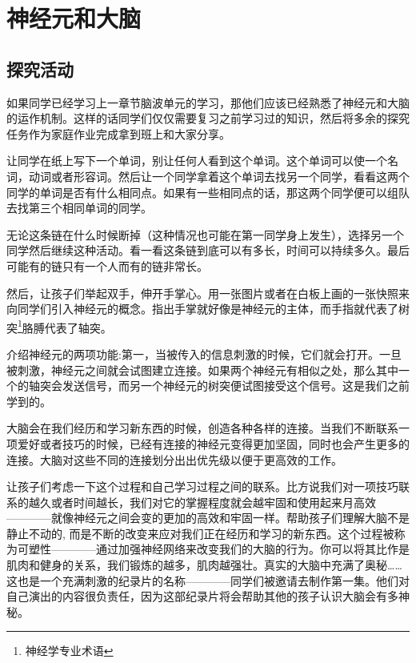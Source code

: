 \chapter{神经元和大脑}
   
\section{探究活动}
      \begin{note}
        如果同学已经学习上一章节脑波单元的学习，那他们应该已经熟悉了神经元和大脑的运作机制。这样的话同学们仅仅需要复习之前学习过的知识，然后将多余的探究任务作为家庭作业完成拿到班上和大家分享。        
      \end{note}  
      让同学在纸上写下一个单词，别让任何人看到这个单词。这个单词可以使一个名词，动词或者形容词。然后让一个同学拿着这个单词去找另一个同学，看看这两个同学的单词是否有什么相同点。如果有一些相同点的话，那这两个同学便可以组队去找第三个相同单词的同学。\par
      无论这条链在什么时候断掉（这种情况也可能在第一同学身上发生），选择另一个同学然后继续这种活动。看一看这条链到底可以有多长，时间可以持续多久。最后可能有的链只有一个人而有的链非常长。\par
      然后，让孩子们举起双手，伸开手掌心。用一张图片或者在白板上画的一张快照来向同学们引入神经元的概念。指出手掌就好像是神经元的主体，而手指就代表了树突\footnote{神经学专业术语}胳膊代表了轴突。\par
      介绍神经元的两项功能:第一，当被传入的信息刺激的时候，它们就会打开。一旦被刺激，神经元之间就会试图建立连接。如果两个神经元有相似之处，那么其中一个的轴突会发送信号，而另一个神经元的树突便试图接受这个信号。这是我们之前学到的。\par
      大脑会在我们经历和学习新东西的时候，创造各种各样的连接。当我们不断联系一项爱好或者技巧的时候，已经有连接的神经元变得更加坚固，同时也会产生更多的连接。大脑对这些不同的连接划分出出优先级以便于更高效的工作。\par
      让孩子们考虑一下这个过程和自己学习过程之间的联系。比方说我们对一项技巧联系的越久或者时间越长，我们对它的掌握程度就会越牢固和使用起来月高效————就像神经元之间会变的更加的高效和牢固一样。帮助孩子们理解大脑不是静止不动的, 而是不断的改变来应对我们正在经历和学习的新东西。这个过程被称为可塑性————通过加强神经网络来改变我们的大脑的行为。你可以将其比作是肌肉和健身的关系，我们锻炼的越多，肌肉越强壮。真实的大脑中充满了奥秘……这也是一个充满刺激的纪录片的名称————同学们被邀请去制作第一集。他们对自己演出的内容很负责任，因为这部纪录片将会帮助其他的孩子认识大脑会有多神秘。\par
